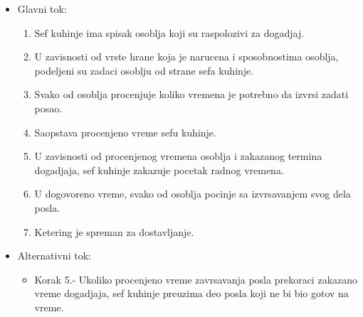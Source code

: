 \documentclass[a4paper]{article}
\begin{document}
      \begin{itemize}
        \item Glavni tok:
          \begin{enumerate}
              \item Sef kuhinje ima spisak osoblja koji su raspolozivi za dogadjaj.
        
              \item U zavisnosti od vrste hrane koja je narucena i sposobnostima osoblja, podeljeni su zadaci osoblju od strane sefa kuhinje.
        
              \item Svako od osoblja procenjuje koliko vremena je potrebno da izvrsi zadati posao.
          
              \item Saopstava procenjeno vreme sefu kuhinje.
         
              \item U zavisnosti od procenjenog vremena osoblja i zakazanog termina dogadjaja, sef kuhinje zakazuje pocetak radnog vremena.
       
              \item U dogovoreno vreme, svako od osoblja pocinje sa izvrsavanjem svog dela posla.
          
              \item Ketering je spreman za dostavljanje.
          \end{enumerate}
    \end{itemize}
      \begin{itemize}
        \item Alternativni tok:
          \begin{itemize}
        \item Korak 5.- Ukoliko procenjeno vreme zavrsavanja posla prekoraci zakazano vreme dogadjaja, sef kuhinje preuzima deo posla koji ne bi bio gotov na vreme.
    \end{itemize}
    \end{itemize}
    
    
\end{document}
